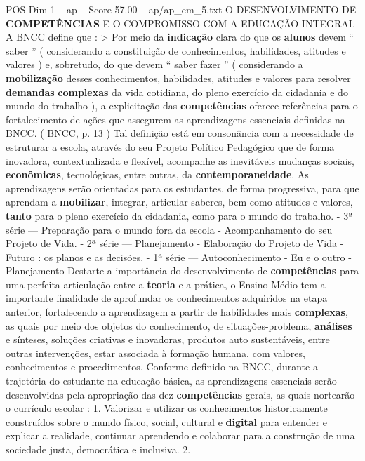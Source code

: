 \begin{textsample}{POS Dim 1 – ap – Score 57.00 – ap/ap\_em\_5.txt}  \label{ex:f1_pos_162}
O DESENVOLVIMENTO DE \textbf{COMPETÊNCIAS} E O COMPROMISSO COM A EDUCAÇÃO INTEGRAL A BNCC define que : > Por meio da \textbf{indicação} clara do que os \textbf{alunos} devem “ saber ” ( considerando a constituição de conhecimentos, habilidades, atitudes e valores ) e, sobretudo, do que devem “ saber fazer ” ( considerando a \textbf{mobilização} desses conhecimentos, habilidades, atitudes e valores para resolver \textbf{demandas} \textbf{complexas} da vida cotidiana, do pleno exercício da cidadania e do mundo do trabalho ), a explicitação das \textbf{competências} oferece referências para o fortalecimento de ações que assegurem as aprendizagens essenciais definidas na BNCC. ( BNCC, p. 13 ) Tal definição está em consonância com a necessidade de estruturar a escola, através do seu Projeto Político Pedagógico que de forma inovadora, contextualizada e flexível, acompanhe as inevitáveis mudanças sociais, \textbf{econômicas}, tecnológicas, entre outras, da \textbf{contemporaneidade}.
As aprendizagens serão orientadas para os estudantes, de forma progressiva, para que aprendam a \textbf{mobilizar}, integrar, articular saberes, bem como atitudes e valores, \textbf{tanto} para o pleno exercício da cidadania, como para o mundo do trabalho. - 3ª série — Preparação para o mundo fora da escola - Acompanhamento do seu Projeto de Vida. - 2ª série — Planejamento - Elaboração do Projeto de Vida - Futuro : os planos e as decisões. - 1ª série — Autoconhecimento - Eu e o outro - Planejamento Destarte a importância do desenvolvimento de \textbf{competências} para uma perfeita articulação entre a \textbf{teoria} e a prática, o Ensino Médio tem a importante finalidade de aprofundar os conhecimentos adquiridos na etapa anterior, fortalecendo a aprendizagem a partir de habilidades mais \textbf{complexas}, as quais por meio dos objetos do conhecimento, de situações-problema, \textbf{análises} e sínteses, soluções criativas e inovadoras, produtos auto sustentáveis, entre outras intervenções, estar associada à formação humana, com valores, conhecimentos e procedimentos.
Conforme definido na BNCC, durante a trajetória do estudante na educação básica, as aprendizagens essenciais serão desenvolvidas pela apropriação das dez \textbf{competências} gerais, as quais nortearão o currículo escolar : 1.
Valorizar e utilizar os conhecimentos historicamente construídos sobre o mundo físico, social, cultural e \textbf{digital} para entender e explicar a realidade, continuar aprendendo e colaborar para a construção de uma sociedade justa, democrática e inclusiva. 2.

\end{textsample}
